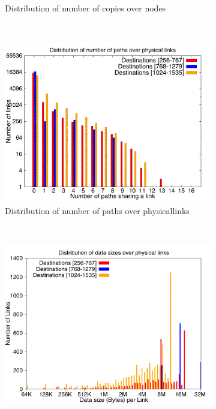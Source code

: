 \documentclass[letter]{article}
\begin{document}
\begin{figure}[!htbp]
\begin{subfigure}[b]{0.49\textwidth}
                \caption{Distribution of number of copies over nodes}
                \label{fig:incrdist_2k_copy}
        \end{subfigure}
        ~ %
        \begin{subfigure}[b]{0.49\textwidth}
                \includegraphics[width=\textwidth]{report_figures/incrdist/2k/loadpath_histo.pdf}
                \caption{Distribution of number of paths over physicallinks}
                \label{fig:incrdist_2k_loadpath}
        \end{subfigure}
        ~ %
        \begin{subfigure}[b]{0.49\textwidth}
                \includegraphics[width=\textwidth]{report_figures/incrdist/2k/loaddata_histo.pdf}

\end{subfigure}
\end{figure}
\end{document}
